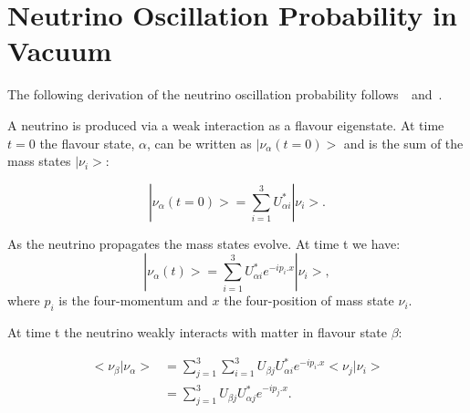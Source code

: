\section{Neutrino Oscillation Probability in Vacuum}

The following derivation of the neutrino oscillation probability
follows~\cite{pdg}~and~\cite{Hiroshi}.

A neutrino is produced via a weak interaction as a flavour
eigenstate. At time $t=0$ the flavour state, $\alpha$, can be written
as $|\nu_{\alpha}\left(t=0\right)>$ and is the sum of the mass states
$|\nu_i>$: 

\begin{equation}
|\nu_{\alpha}\left(t=0\right)> = \sum_{i=1}^{3} U^{*}_{\alpha i}|\nu_i>.
\label{eqn:sumAtTime0}
\end{equation}




As the neutrino propagates the mass states evolve. At time t we have: 
\begin{equation}
|\nu_{\alpha}\left(t\right)> = \sum_{i=1}^{3} U^{*}_{\alpha i}
e^{-ip_i.x}|\nu_i>, 
\end{equation}
\noindent where $p_i$ is the four-momentum and $x$ the four-position
of mass state $\nu_i$. 

At time t the neutrino weakly interacts with matter in flavour state $\beta$:

\begin{equation}
\begin{split}
<\nu_{\beta}|\nu_{\alpha}> &= \sum_{j=1}^{3}\sum_{i=1}^{3}U_{\beta j}
U^{*}_{\alpha i} e^{-ip_i.x} <\nu_j|\nu_i>\\ 
&= \sum_{j=1}^{3}U_{\beta j}   U^{*}_{\alpha j} e^{-ip_j.x}.
\end{split}
\label{eqn:nubeta_nualpha}
\end{equation}

